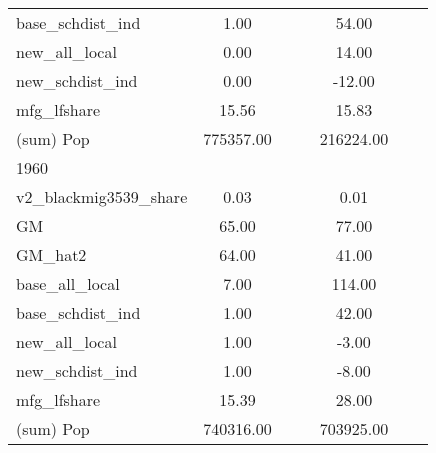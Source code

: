 \begin{table}[htbp]
\begin{tabular}{l*{2}{ccc}}
base\_schdist\_ind    &        1.00&            &            &       54.00&            &            \\
new\_all\_local       &        0.00&            &            &       14.00&            &            \\
new\_schdist\_ind     &        0.00&            &            &      -12.00&            &            \\
mfg\_lfshare         &       15.56&            &            &       15.83&            &            \\
(sum) Pop           &   775357.00&            &            &   216224.00&            &            \\
\midrule
1960                &            &            &            &            &            &            \\
v2\_blackmig3539\_share&        0.03&            &            &        0.01&            &            \\
GM                  &       65.00&            &            &       77.00&            &            \\
GM\_hat2             &       64.00&            &            &       41.00&            &            \\
base\_all\_local      &        7.00&            &            &      114.00&            &            \\
base\_schdist\_ind    &        1.00&            &            &       42.00&            &            \\
new\_all\_local       &        1.00&            &            &       -3.00&            &            \\
new\_schdist\_ind     &        1.00&            &            &       -8.00&            &            \\
mfg\_lfshare         &       15.39&            &            &       28.00&            &            \\
(sum) Pop           &   740316.00&            &            &   703925.00&            &            \\
\bottomrule
\end{tabular}
\end{table}

